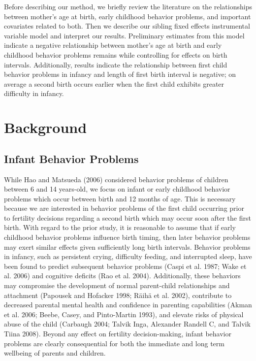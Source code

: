 \documentclass[]{article}
\begin{document}
Before describing our method, we briefly review the literature on the
relationships between mother's age at birth, early childhood behavior
problems, and important covariates related to both. Then we describe our
sibling fixed effects instrumental variable model and interpret our
results. Preliminary estimates from this model indicate a negative
relationship between mother's age at birth and early childhood behavior
problems remains while controlling for effects on birth intervals.
Additionally, results indicate the relationship between first child
behavior problems in infancy and length of first birth interval is
negative; on average a second birth occurs earlier when the first child
exhibits greater difficulty in infancy.

\section{Background}\label{background}

\subsection{Infant Behavior Problems}\label{infant-behavior-problems}

While Hao and Matsueda (2006) considered behavior problems of children
between 6 and 14 years-old, we focus on infant or early childhood
behavior problems which occur between birth and 12 months of age. This
is necessary because we are interested in behavior problems of the first
child occurring prior to fertility decisions regarding a second birth
which may occur soon after the first birth. With regard to the prior
study, it is reasonable to assume that if early childhood behavior
problems influence birth timing, then later behavior problems may exert
similar effects given sufficiently long birth intervals. Behavior
problems in infancy, such as persistent crying, difficulty feeding, and
interrupted sleep, have been found to predict subsequent behavior
problems (Caspi et al. 1987; Wake et al. 2006) and cognitive deficits
(Rao et al. 2004). Additionally, these behaviors may compromise the
development of normal parent-child relationships and attachment
(Papousek and Hofacker 1998; Räihä et al. 2002), contribute to decreased
parental mental health and confidence in parenting capabilities (Akman
et al. 2006; Beebe, Casey, and Pinto-Martin 1993), and elevate risks of
physical abuse of the child (Carbaugh 2004; Talvik Inga, Alexander
Randell C, and Talvik Tiina 2008). Beyond any effect on fertility
decision-making, infant behavior problems are clearly consequential for
both the immediate and long term wellbeing of parents and children.
\end{document}
